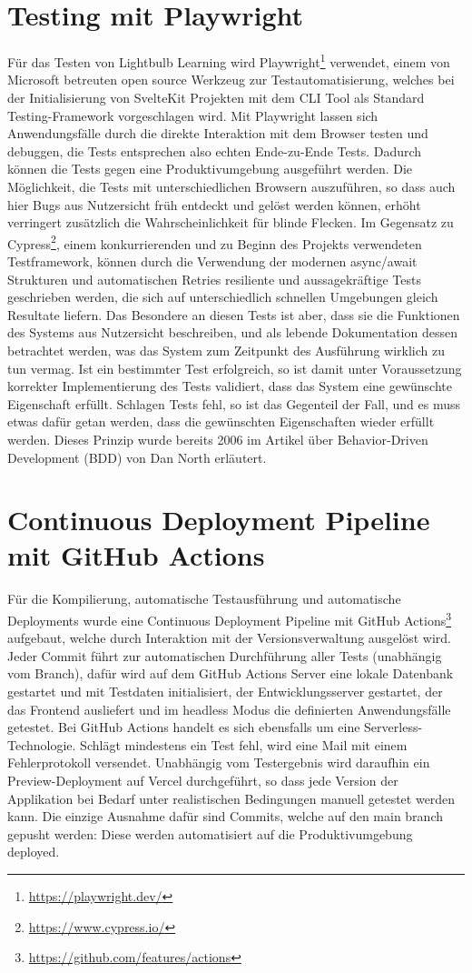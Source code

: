 \section{Testing mit Playwright}
Für das Testen von Lightbulb Learning wird Playwright\footnote{\url{https://playwright.dev/}} verwendet, einem von Microsoft betreuten open source Werkzeug zur Testautomatisierung, welches bei der Initialisierung von SvelteKit Projekten mit dem CLI Tool als Standard Testing-Framework vorgeschlagen wird. Mit Playwright lassen sich Anwendungsfälle durch die direkte Interaktion mit dem Browser testen und debuggen, die Tests entsprechen also echten Ende-zu-Ende Tests. Dadurch können die Tests gegen eine Produktivumgebung ausgeführt werden. Die Möglichkeit, die Tests mit unterschiedlichen Browsern auszuführen, so dass auch hier Bugs aus Nutzersicht früh entdeckt und gelöst werden können, erhöht verringert zusätzlich die Wahrscheinlichkeit für blinde Flecken. Im Gegensatz zu Cypress\footnote{\url{https://www.cypress.io/}}, einem konkurrierenden und zu Beginn des Projekts verwendeten Testframework, können durch die Verwendung der modernen async/await Strukturen und automatischen Retries resiliente und aussagekräftige Tests geschrieben werden, die sich auf unterschiedlich schnellen Umgebungen gleich Resultate liefern. Das Besondere an diesen Tests ist aber, dass sie die Funktionen des Systems aus Nutzersicht beschreiben, und als lebende Dokumentation dessen betrachtet werden, was das System zum Zeitpunkt des Ausführung wirklich zu tun vermag. Ist ein bestimmter Test erfolgreich, so ist damit unter Voraussetzung korrekter Implementierung des Tests validiert, dass das System eine gewünschte Eigenschaft erfüllt. Schlagen Tests fehl, so ist das Gegenteil der Fall, und es muss etwas dafür getan werden, dass die gewünschten Eigenschaften wieder erfüllt werden. Dieses Prinzip wurde bereits 2006 im Artikel über Behavior-Driven Development \cite[vgl.][]{North2006} (BDD) von Dan North erläutert.
\section{Continuous Deployment Pipeline mit GitHub Actions}
Für die Kompilierung, automatische Testausführung und automatische Deployments wurde eine Continuous Deployment Pipeline mit GitHub Actions\footnote{\url{https://github.com/features/actions}} aufgebaut, welche durch Interaktion mit der Versionsverwaltung ausgelöst wird. Jeder Commit führt zur automatischen Durchführung aller Tests (unabhängig vom Branch), dafür wird auf dem GitHub Actions Server eine lokale Datenbank gestartet und mit Testdaten initialisiert, der Entwicklungsserver gestartet, der das Frontend ausliefert und im headless Modus die definierten Anwendungsfälle getestet. Bei GitHub Actions handelt es sich ebensfalls um eine Serverless-Technologie. Schlägt mindestens ein Test fehl, wird eine Mail mit einem Fehlerprotokoll versendet. Unabhängig vom Testergebnis wird daraufhin ein Preview-Deployment auf Vercel durchgeführt, so dass jede Version der Applikation bei Bedarf unter realistischen Bedingungen manuell getestet werden kann. Die einzige Ausnahme dafür sind Commits, welche auf den main branch gepusht werden: Diese werden automatisiert auf die Produktivumgebung deployed.